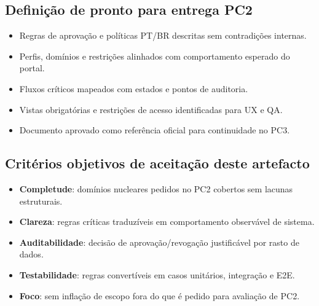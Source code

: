 \documentclass[11pt,a4paper,twoside]{article}
\begin{document}
\subsection{Definição de pronto para entrega PC2}
\begin{itemize}
  \item Regras de aprovação e políticas PT/BR descritas sem contradições internas.
  \item Perfis, domínios e restrições alinhados com comportamento esperado do portal.
  \item Fluxos críticos mapeados com estados e pontos de auditoria.
  \item Vistas obrigatórias e restrições de acesso identificadas para UX e QA.
  \item Documento aprovado como referência oficial para continuidade no PC3.
\end{itemize}

\subsection{Critérios objetivos de aceitação deste artefacto}
\begin{itemize}
  \item \textbf{Completude}: domínios nucleares pedidos no PC2 cobertos sem lacunas estruturais.
  \item \textbf{Clareza}: regras críticas traduzíveis em comportamento observável de sistema.
  \item \textbf{Auditabilidade}: decisão de aprovação/revogação justificável por rasto de dados.
  \item \textbf{Testabilidade}: regras convertíveis em casos unitários, integração e E2E.
  \item \textbf{Foco}: sem inflação de escopo fora do que é pedido para avaliação de PC2.
\end{itemize}
\end{document}
